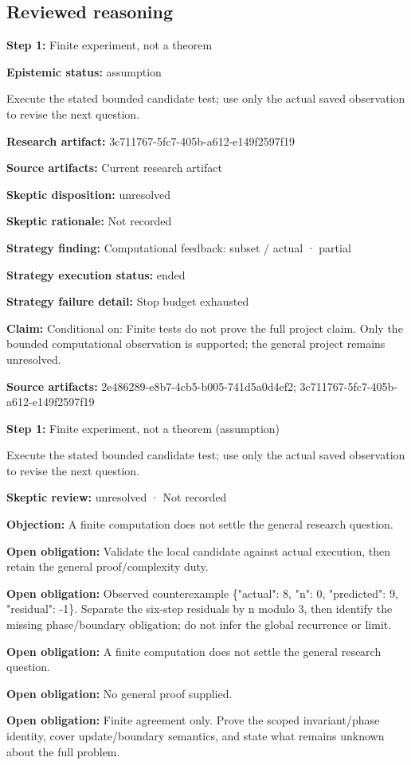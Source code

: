 \documentclass[11pt]{article}
\begin{document}
\subsection{Reviewed reasoning}
\textbf{Step 1:} Finite experiment, not a theorem\par
\textbf{Epistemic status:} assumption\par
Execute the stated bounded candidate test; use only the actual saved observation to revise the next question.\par
\textbf{Research artifact:} 3c711767-5fc7-405b-a612-e149f2597f19\par
\textbf{Source artifacts:} Current research artifact\par
\textbf{Skeptic disposition:} unresolved\par
\textbf{Skeptic rationale:} Not recorded\par
\textbf{Strategy finding:} Computational feedback: subset / actual · partial\par
\textbf{Strategy execution status:} ended\par
\textbf{Strategy failure detail:} Stop budget exhausted\par
\textbf{Claim:} Conditional on: Finite tests do not prove the full project claim. Only the bounded computational observation is supported; the general project remains unresolved.\par
\textbf{Source artifacts:} 2e486289-e8b7-4cb5-b005-741d5a0d4ef2; 3c711767-5fc7-405b-a612-e149f2597f19\par
\textbf{Step 1:} Finite experiment, not a theorem (assumption)\par
Execute the stated bounded candidate test; use only the actual saved observation to revise the next question.\par
\textbf{Skeptic review:} unresolved · Not recorded\par
\textbf{Objection:} A finite computation does not settle the general research question.\par
\textbf{Open obligation:} Validate the local candidate against actual execution, then retain the general proof/complexity duty.\par
\textbf{Open obligation:} Observed counterexample \{"actual": 8, "n": 0, "predicted": 9, "residual": -1\}. Separate the six-step residuals by n modulo 3, then identify the missing phase/boundary obligation; do not infer the global recurrence or limit.\par
\textbf{Open obligation:} A finite computation does not settle the general research question.\par
\textbf{Open obligation:} No general proof supplied.\par
\textbf{Open obligation:} Finite agreement only. Prove the scoped invariant/phase identity, cover update/boundary semantics, and state what remains unknown about the full problem.\par
\end{document}
